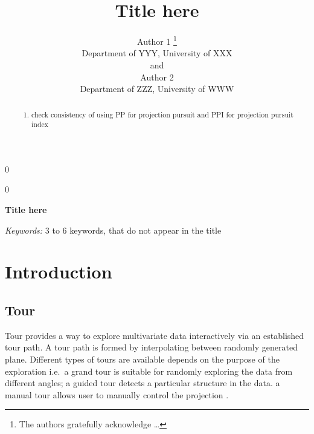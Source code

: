 \documentclass[12pt]{article}
\providecommand{\tightlist}{%
  \setlength{\itemsep}{0pt}\setlength{\parskip}{0pt}}
\newcommand{\blind}{0}
\begin{document}
\def\spacingset#1{\renewcommand{\baselinestretch}%
{#1}\small\normalsize} \spacingset{1}



\blind
{
  \title{\bf Title here}

  \author{
        Author 1 \thanks{The authors gratefully acknowledge \ldots{}} \\
    Department of YYY, University of XXX\\
     and \\     Author 2 \\
    Department of ZZZ, University of WWW\\
      }
  \maketitle
} \fi

\blind
{
  \bigskip
  \bigskip
  \bigskip
  \begin{center}
    {\LARGE\bf Title here}
  \end{center}
  \medskip
} \fi

\bigskip
\begin{abstract}
\begin{enumerate}
\def\labelenumi{\arabic{enumi}.}
\tightlist
\item
  check consistency of using PP for projection pursuit and PPI for
  projection pursuit index
\end{enumerate}
\end{abstract}

\noindent%
{\it Keywords:} 3 to 6 keywords, that do not appear in the title
\vfill

\newpage
\spacingset{1.45} %

\hypertarget{introduction}{%
\section{Introduction}\label{introduction}}

\hypertarget{tour}{%
\subsection{Tour}\label{tour}}

Tour provides a way to explore multivariate data interactively via an
established tour path. A tour path is formed by interpolating between
randomly generated plane. Different types of tours are available depends
on the purpose of the exploration i.e.~a grand tour is suitable for
randomly exploring the data from different angles; a guided tour detects
a particular structure in the data. a manual tour allows user to
manually control the projection \citep{cook1997manual}.
\end{document}
